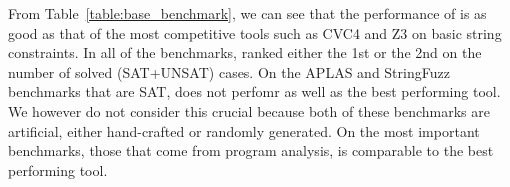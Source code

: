 

From Table~\ref{table:base_benchmark}, we can see that the performance of {\tool} is as good as that of the most competitive tools such as CVC4 and Z3 on basic string constraints. In all of the benchmarks, {\tool} ranked either the 1st or the 2nd on the number of solved (SAT+UNSAT) cases. On the APLAS and StringFuzz benchmarks that are SAT, {\tool} does not perfomr as well as the best performing tool. We however do not consider this crucial because both of these benchmarks are artificial, either hand-crafted or randomly generated. On the most important benchmarks, those that come from program analysis, {\tool} is comparable to the best performing tool.

